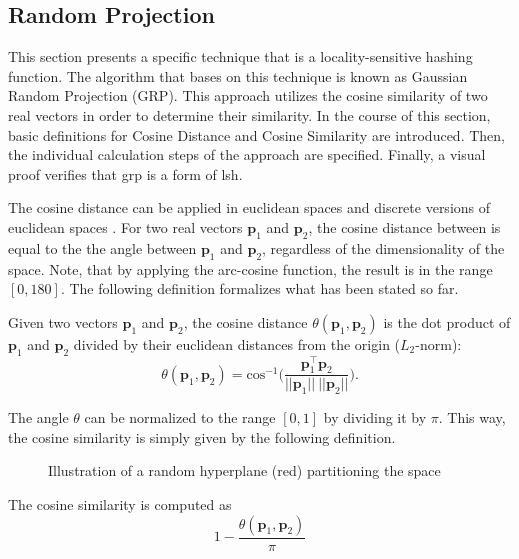 \documentclass[../../../main.tex]{subfiles}
\begin{document}
\subsection{Random Projection}\label{subsec:random_projection}

This section presents a specific technique that is a locality-sensitive hashing function. The algorithm that bases on this technique is known as Gaussian Random Projection (GRP). This approach utilizes the cosine similarity of two real vectors in order to determine their similarity. In the course of this section, basic definitions for Cosine Distance and Cosine Similarity are introduced. Then, the individual calculation steps of the approach are specified. Finally, a visual proof verifies that \gls{grp} is a form of \gls{lsh}.

The cosine distance can be applied in euclidean spaces and discrete versions of euclidean spaces \cite[95]{leskovec_rajaraman_ullman_2014}. For two real vectors $\bm{p}_1$ and $\bm{p}_2$, the cosine distance between is equal to the the angle between $\bm{p}_1$ and $\bm{p}_2$, regardless of the dimensionality of the space. Note, that by applying the arc-cosine function, the result is in the range $[0, 180]$. The following definition formalizes what has been stated so far.

\begin{definition}
    Given two vectors $\bm{p}_1$ and $\bm{p}_2$, the cosine distance $\theta(\bm{p}_1, \bm{p}_2)$ is the dot product of $\bm{p}_1$ and $\bm{p}_2$ divided by their euclidean distances from the origin ($L_2$-norm):
    \begin{equation}
        \theta(\bm{p}_1, \bm{p}_2) = \text{cos}^{-1} \bigg( \frac{\bm{p}_1^\top \bm{p}_2}{||\bm{p}_1|| \: ||\bm{p}_2||} \Bigg).
    \end{equation}
\end{definition}

The angle $\theta$ can be normalized to the range $[0, 1]$ by dividing it by $\pi$. This way, the cosine similarity is simply given by the following definition.

\begin{figure}[t!]
    \centering
    
    \caption{Illustration of a random hyperplane (red) partitioning the space}
    \label{fig:rp_3d}
\end{figure}

\begin{definition}
    The cosine similarity is computed as
    \begin{equation}
        1- \frac{\theta(\bm{p}_1, \bm{p}_2)}{\pi}
    \end{equation}
\end{definition}
\end{document}
